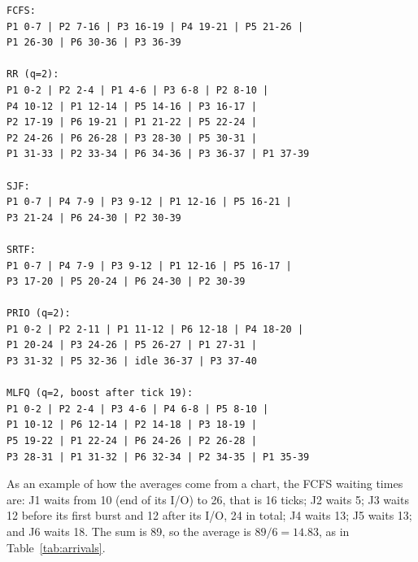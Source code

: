 \begin{lstlisting}
FCFS:
P1 0-7 | P2 7-16 | P3 16-19 | P4 19-21 | P5 21-26 |
P1 26-30 | P6 30-36 | P3 36-39

RR (q=2):
P1 0-2 | P2 2-4 | P1 4-6 | P3 6-8 | P2 8-10 |
P4 10-12 | P1 12-14 | P5 14-16 | P3 16-17 |
P2 17-19 | P6 19-21 | P1 21-22 | P5 22-24 |
P2 24-26 | P6 26-28 | P3 28-30 | P5 30-31 |
P1 31-33 | P2 33-34 | P6 34-36 | P3 36-37 | P1 37-39

SJF:
P1 0-7 | P4 7-9 | P3 9-12 | P1 12-16 | P5 16-21 |
P3 21-24 | P6 24-30 | P2 30-39

SRTF:
P1 0-7 | P4 7-9 | P3 9-12 | P1 12-16 | P5 16-17 |
P3 17-20 | P5 20-24 | P6 24-30 | P2 30-39

PRIO (q=2):
P1 0-2 | P2 2-11 | P1 11-12 | P6 12-18 | P4 18-20 |
P1 20-24 | P3 24-26 | P5 26-27 | P1 27-31 |
P3 31-32 | P5 32-36 | idle 36-37 | P3 37-40

MLFQ (q=2, boost after tick 19):
P1 0-2 | P2 2-4 | P3 4-6 | P4 6-8 | P5 8-10 |
P1 10-12 | P6 12-14 | P2 14-18 | P3 18-19 |
P5 19-22 | P1 22-24 | P6 24-26 | P2 26-28 |
P3 28-31 | P1 31-32 | P6 32-34 | P2 34-35 | P1 35-39
\end{lstlisting}

As an example of how the averages come from a chart, the FCFS waiting times are: J1 waits from 10 (end of its I/O) to 26, that is 16 ticks; J2 waits 5; J3 waits 12 before its first burst and 12 after its I/O, 24 in total; J4 waits 13; J5 waits 13; and J6 waits 18. The sum is 89, so the average is $89/6 = 14.83$, as in Table~\ref{tab:arrivals}.
